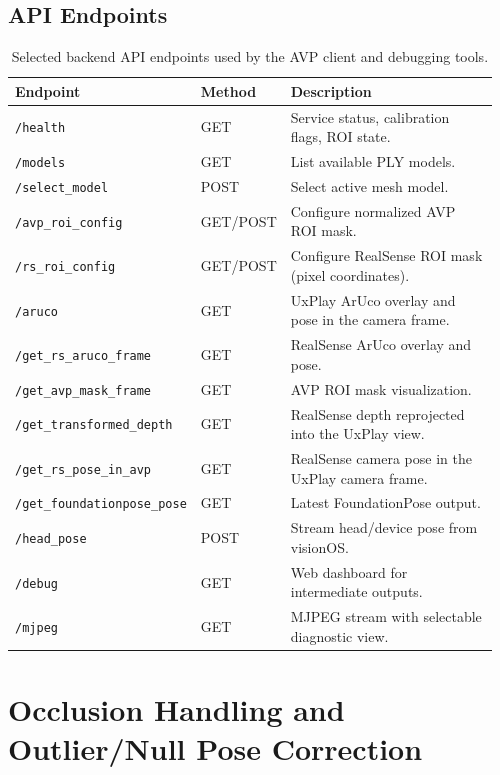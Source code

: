 \subsection{API Endpoints}
\setlength{\tabcolsep}{3pt}
\renewcommand{\arraystretch}{1.05}
\small
\begin{table}[H]
\centering
\caption[Backend endpoints]{Selected backend API endpoints used by the AVP client and debugging tools.}
\label{tab:api_endpoints_app}
\begin{tabular}{p{0.34\linewidth}p{0.12\linewidth}p{0.50\linewidth}}
\toprule
\textbf{Endpoint} & \textbf{Method} & \textbf{Description} \\
\midrule
\texttt{/health} & GET & Service status, calibration flags, ROI state. \\ \texttt{/models} & GET & List available PLY models. \\ \texttt{/select\_model} & POST & Select active mesh model. \\ \texttt{/avp\_roi\_config} & GET/POST & Configure normalized AVP ROI mask. \\ \texttt{/rs\_roi\_config} & GET/POST & Configure RealSense ROI mask (pixel coordinates). \\ \texttt{/aruco} & GET & UxPlay ArUco overlay and pose in the camera frame. \\ \texttt{/get\_rs\_aruco\_frame} & GET & RealSense ArUco overlay and pose. \\ \texttt{/get\_avp\_mask\_frame} & GET & AVP ROI mask visualization. \\ \texttt{/get\_transformed\_depth} & GET & RealSense depth reprojected into the UxPlay view. \\ \texttt{/get\_rs\_pose\_in\_avp} & GET & RealSense camera pose in the UxPlay camera frame. \\ \texttt{/get\_foundationpose\_pose} & GET & Latest FoundationPose output. \\ \texttt{/head\_pose} & POST & Stream head/device pose from visionOS. \\ \texttt{/debug} & GET & Web dashboard for intermediate outputs. \\ \texttt{/mjpeg} & GET & MJPEG stream with selectable diagnostic view. \\
\bottomrule
\end{tabular}
\end{table}
\normalsize


\section{Occlusion Handling and Outlier/Null Pose Correction}
\label{app:occlusion_and_masking}

